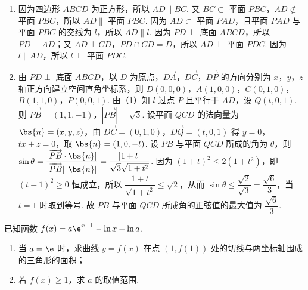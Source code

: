 \begin{solution}
\begin{enumerate}
\item 因为四边形 \(ABCD\) 为正方形，所以 \(AD\parallel BC\). 又 \(BC\subset\) 平面 \(PBC\)，\(AD\not\subset\) 平面 \(PBC\)，所以 \(AD\parallel\) 平面 \(PBC\). 因为 \(AD\subset\) 平面 \(PAD\)，且平面 \(PAD\) 与平面 \(PBC\) 的交线为 \(l\)，所以 \(AD\parallel l\). 因为 \(PD\perp\) 底面 \(ABCD\)，所以 \(PD\perp AD\)；又 \(AD\perp CD\)，\(PD\cap CD=D\)，所以 \(AD\perp\) 平面 \(PDC\). 因为 \(l\parallel AD\)，所以 \(l\perp\) 平面 \(PDC\).
\item 由 \(PD\perp\) 底面 \(ABCD\)，以 \(D\) 为原点，\(\overrightarrow{DA}\)，\(\overrightarrow{DC}\)，\(\overrightarrow{DP}\) 的方向分别为 \(x\)，\(y\)，\(z\) 轴正方向建立空间直角坐标系，则 \(D(0,0,0)\)，\(A(1,0,0)\)，\(C(0,1,0)\)，\(B(1,1,0)\)，\(P(0,0,1)\). 由（1）知 \(l\) 过点 \(P\) 且平行于 \(AD\)，设 \(Q(t,0,1)\). 则 \(\overrightarrow{PB}=(1,1,-1)\)，\(|\overrightarrow{PB}|=\sqrt3\). 设平面 \(QCD\) 的法向量为 \(\bs{n}=(x,y,z)\)，由 \(\overrightarrow{DC}=(0,1,0)\)，\(\overrightarrow{DQ}=(t,0,1)\) 得 \(y=0\)，\(tx+z=0\)，取 \(\bs{n}=(1,0,-t)\). 设 \(PB\) 与平面 \(QCD\) 所成的角为 \(\theta\)，则 \(\sin\theta=\dfrac{|\overrightarrow{PB}\cdot\bs{n}|}{|\overrightarrow{PB}|\,|\bs{n}|}=\dfrac{|1+t|}{\sqrt3\sqrt{1+t^2}}\). 因为 \((1+t)^2\le2(1+t^2)\)，即 \((t-1)^2\ge0\) 恒成立，所以 \(\dfrac{|1+t|}{\sqrt{1+t^2}}\le\sqrt2\)，从而 \(\sin\theta\le\dfrac{\sqrt2}{\sqrt3}=\dfrac{\sqrt6}{3}\)，当 \(t=1\) 时取到等号. 故 \(PB\) 与平面 \(QCD\) 所成角的正弦值的最大值为 \(\dfrac{\sqrt6}{3}\).
\end{enumerate}
\end{solution}

\begin{problem}
已知函数 \(f(x)=a\e^{x-1}-\ln x+\ln a\).

\begin{enumerate}
\item 当 \(a=\e\) 时，求曲线 \(y=f(x)\) 在点 \(\left( 1,f(1) \right)\) 处的切线与两坐标轴围成的三角形的面积；
\item 若 \(f(x)\ge 1\)，求 \(a\) 的取值范围.
\end{enumerate}
\end{problem}

